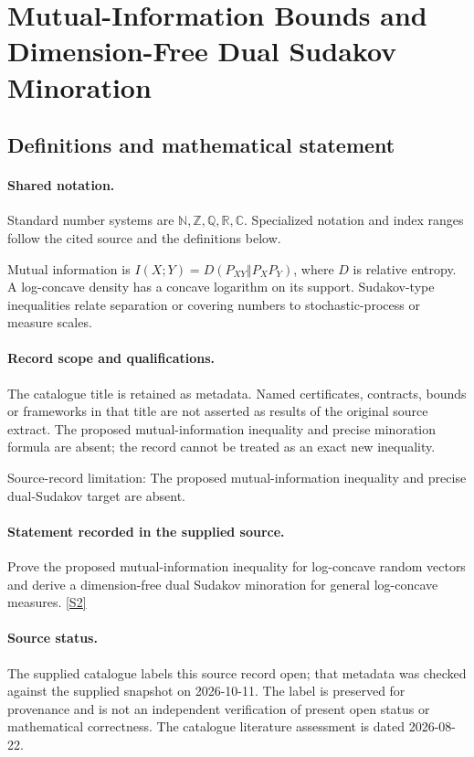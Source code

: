 \documentclass[11pt]{article}
\newcommand{\sref}[2]{\hyperlink{source:#1:#2}{[S#2]}}
\begin{document}
\section{Mutual-Information Bounds and Dimension-Free Dual Sudakov Minoration}\label{statement}

\subsection{Definitions and mathematical statement}

\paragraph{Shared notation.}Standard number systems are $\mathbb N,\mathbb Z,\mathbb Q,\mathbb R,\mathbb C$. Specialized notation and index ranges follow the cited source and the definitions below.


Mutual information is $I(X;Y)=D(P_{XY}\Vert P_XP_Y)$, where $D$ is relative entropy. A log-concave density has a concave logarithm on its support. Sudakov-type inequalities relate separation or covering numbers to stochastic-process or measure scales.
\paragraph{Record scope and qualifications.}
The catalogue title is retained as metadata. Named certificates, contracts, bounds or frameworks in that title are not asserted as results of the original source extract.
The proposed mutual-information inequality and precise minoration formula are absent; the record cannot be treated as an exact new inequality.

Source-record limitation: The proposed mutual-information inequality and precise dual-Sudakov target are absent.
\paragraph{Statement recorded in the supplied source.}
Prove the proposed mutual-information inequality for log-concave random vectors and derive a dimension-free dual Sudakov minoration for general log-concave measures. \sref{statement}{2}
\paragraph{Source status.}
The supplied catalogue labels this source record open; that metadata was checked against the supplied snapshot on 2026-10-11. The label is preserved for provenance and is not an independent verification of present open status or mathematical correctness. The catalogue literature assessment is dated 2026-08-22.
\end{document}
